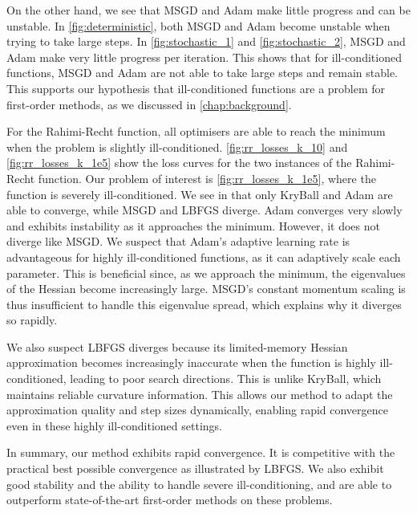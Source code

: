 On the other hand, we see that MSGD and Adam make little progress and can be unstable. In \cref{fig:deterministic}, both MSGD and Adam become unstable when trying to take large steps. In \cref{fig:stochastic_1} and \cref{fig:stochastic_2}, MSGD and Adam make very little progress per iteration. This shows that for ill-conditioned functions, MSGD and Adam are not able to take large steps and remain stable. This supports our hypothesis that ill-conditioned functions are a problem for first-order methods, as we discussed in \cref{chap:background}.

For the Rahimi-Recht function, all optimisers are able to reach the minimum when the problem is slightly ill-conditioned. \cref{fig:rr_losses_k_10} and \cref{fig:rr_losses_k_1e5} show the loss curves for the two instances of the Rahimi-Recht function. Our problem of interest is \cref{fig:rr_losses_k_1e5}, where the function is severely ill-conditioned. We see in  that only KryBall and Adam are able to converge, while MSGD and LBFGS diverge. Adam converges very slowly and exhibits instability as it approaches the minimum. However, it does not diverge like MSGD. We suspect that Adam's adaptive learning rate is advantageous for highly ill-conditioned functions, as it can adaptively scale each parameter. This is beneficial since, as we approach the minimum, the eigenvalues of the Hessian become increasingly large. MSGD's constant momentum scaling is thus insufficient to handle this eigenvalue spread, which explains why it diverges so rapidly.

We also suspect LBFGS diverges because its limited-memory Hessian approximation becomes increasingly inaccurate when the function is highly ill-conditioned, leading to poor search directions. This is unlike KryBall, which maintains reliable curvature information. This allows our method to adapt the approximation quality and step sizes dynamically, enabling rapid convergence even in these highly ill-conditioned settings.

In summary, our method exhibits rapid convergence. It is competitive with the practical best possible convergence as illustrated by LBFGS. We also exhibit good stability and the ability to handle severe ill-conditioning, and are able to outperform state-of-the-art first-order methods on these problems.

